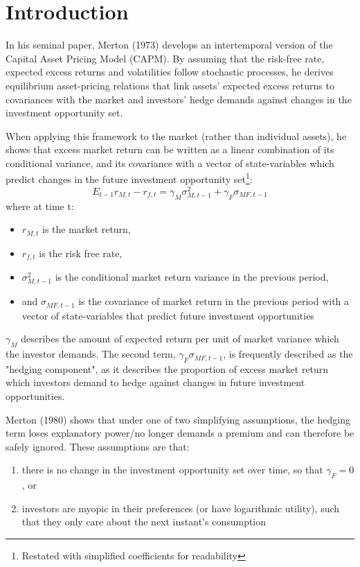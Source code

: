 \documentclass[12pt]{article}
\begin{document}
\newpage
\setcounter{page}{1}
\section{Introduction}
In his seminal paper, Merton (1973) develops an intertemporal version of the Capital Asset Pricing Model (CAPM). By assuming that the risk-free rate, expected excess returns and volatilities follow stochastic processes, he derives equilibrium asset-pricing relations that link assets' expected excess returns to covariances with the market and investors' hedge demands against changes in the investment opportunity set. \par
When applying this framework to the market (rather than individual assets), he shows that excess market return can be written as a linear combination of its conditional variance, and its covariance with a vector of state-variables which predict changes in the future investment opportunity set\footnote{Restated with simplified coefficients for readability}:
\begin{equation}
\nonumber
E_{t-1}r_{M,t}-r_{f,t}=\gamma_M\sigma_{M,t-1}^2+\gamma_F\sigma_{MF,t-1}
\end{equation}
\noindent where at time t:
\begin{itemize}
\item$r_{M,t}$ is the market return,
\item$r_{f,t}$ is the risk free rate,
\item$\sigma_{M,t-1}^2$ is the conditional market return variance in the previous period,
\item and $\sigma_{MF,t-1}$ is the covariance of market return in the previous period with a vector of state-variables that predict future investment opportunities
\end{itemize}
$\gamma_M$ describes the amount of expected return per unit of market variance which the investor demands. The second term, $\gamma_F\sigma_{MF,t-1}$, is frequently described as the "hedging component", as it describes the proportion of excess market return which investors demand to hedge against changes in future investment opportunities.\par
Merton (1980) shows that under one of two simplifying assumptions, the hedging term loses explanatory power/no longer demands a premium and can therefore be safely ignored. These assumptions are that:
\begin{enumerate}
\item there is no change in the investment opportunity set over time, so that $\gamma_F=0$, or
\item investors are myopic in their preferences (or have logarithmic utility), such that they only care about the next instant's consumption
\end{enumerate}\par
\end{document}
